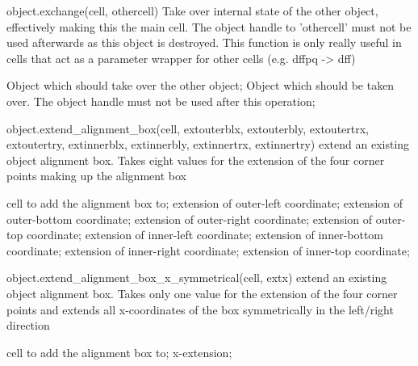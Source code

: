 \begin{APIfunc}{object.exchange(cell, othercell)}
    Take over internal state of the other object, effectively making this the main cell. The object handle to 'othercell' must not be used afterwards as this object is destroyed. This function is only really useful in cells that act as a parameter wrapper for other cells (e.g. dffpq -> dff)
    \begin{APIparameters}
            Object which should take over the other object;
            Object which should be taken over. The object handle must not be used after this operation;
    \end{APIparameters}
\end{APIfunc}
\begin{APIfunc}{object.extend\_alignment\_box(cell, extouterblx, extouterbly, extoutertrx, extoutertry, extinnerblx, extinnerbly, extinnertrx, extinnertry)}
    extend an existing object alignment box. Takes eight values for the extension of the four corner points making up the alignment box
    \begin{APIparameters}
            cell to add the alignment box to;
            extension of outer-left coordinate;
            extension of outer-bottom coordinate;
            extension of outer-right coordinate;
            extension of outer-top coordinate;
            extension of inner-left coordinate;
            extension of inner-bottom coordinate;
            extension of inner-right coordinate;
            extension of inner-top coordinate;
    \end{APIparameters}
\end{APIfunc}
\begin{APIfunc}{object.extend\_alignment\_box\_x\_symmetrical(cell, extx)}
    extend an existing object alignment box. Takes only one value for the extension of the four corner points and extends all x-coordinates of the box symmetrically in the left/right direction
    \begin{APIparameters}
            cell to add the alignment box to;
            x-extension;
    \end{APIparameters}
\end{APIfunc}
